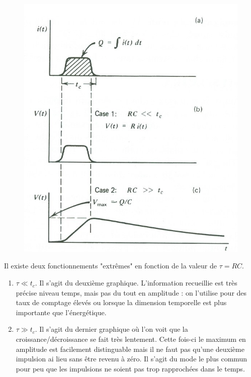 	\begin{figure}
	\vspace{-5mm}
	\includegraphics[scale=0.25]{ch7/image2}
	\end{figure}

	Il existe deux fonctionnements "extrêmes" en fonction de la
	valeur de $\tau =RC$.
	\begin{enumerate}
	\item $\tau\ll t_c$. Il s'agit du deuxième graphique. 
	L'information recueillie est très précise niveau temps, mais 
	pas du tout en amplitude : on l'utilise pour des taux de 
	comptage élevés ou lorsque la dimension temporelle est plus
	importante que l'énergétique.
	\item $\tau \gg t_c$. Il s'agit du dernier graphique où l'on 
	voit que la croissance/décroissance se fait très lentement. 
	Cette fois-ci le maximum en amplitude est facilement 
	distinguable mais il ne faut pas qu'une deuxième impulsion ai
	lieu sans être revenu à zéro. Il s'agit du mode le plus 
	commun pour peu que les impulsions ne soient pas trop 
	rapprochées dans le temps.
	\end{enumerate}\ 
	
